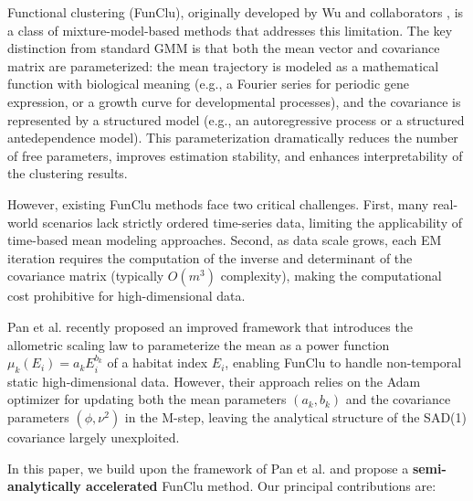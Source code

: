 \documentclass[12pt,a4paper]{article}
\begin{document}
Functional clustering (FunClu), originally developed by Wu and collaborators \cite{ma2002functional,james2003clustering,kim2008computational,wang2012how,wang2014computational,cui2008nonparametric,kim2010wavelet}, is a class of mixture-model-based methods that addresses this limitation. The key distinction from standard GMM is that both the mean vector and covariance matrix are parameterized: the mean trajectory is modeled as a mathematical function with biological meaning (e.g., a Fourier series for periodic gene expression, or a growth curve for developmental processes), and the covariance is represented by a structured model (e.g., an autoregressive process or a structured antedependence model). This parameterization dramatically reduces the number of free parameters, improves estimation stability, and enhances interpretability of the clustering results.

However, existing FunClu methods face two critical challenges. First, many real-world scenarios lack strictly ordered time-series data, limiting the applicability of time-based mean modeling approaches. Second, as data scale grows, each EM iteration requires the computation of the inverse and determinant of the covariance matrix (typically $O(m^3)$ complexity), making the computational cost prohibitive for high-dimensional data.

Pan et al. \cite{pan2026improved} recently proposed an improved framework that introduces the allometric scaling law \cite{west1997general,huxley1936terminology} to parameterize the mean as a power function $\mu_k(E_i) = a_k E_i^{b_k}$ of a habitat index $E_i$, enabling FunClu to handle non-temporal static high-dimensional data. However, their approach relies on the Adam optimizer \cite{kingma2014adam} for updating both the mean parameters $(a_k, b_k)$ and the covariance parameters $(\phi, \nu^2)$ in the M-step, leaving the analytical structure of the SAD(1) covariance largely unexploited.

In this paper, we build upon the framework of Pan et al. \cite{pan2026improved} and propose a \textbf{semi-analytically accelerated} FunClu method. Our principal contributions are:
\end{document}
